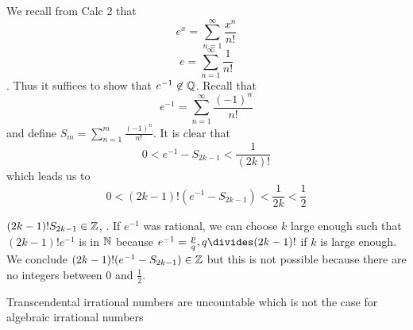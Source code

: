 \begin{solution}
	We recall from Calc 2 that 
	\[
		e^x = \sum_{n=1}^{\infty} \frac{x^n}{n!}
	\]
	\[
		e = \sum_{n=1}^{\infty} \frac{1}{n!}
	\].
	Thus it suffices to show that \( e^{-1} \not \in \mathbb{Q} \). Recall that
	\[
		e^{-1} = \sum_{n=1}^{\infty} \frac{(-1)^n}{n!}
	\]
	and define \( S_m = \sum_{n=1}^{m} \frac{(-1)^n}{n!} \). It is clear that 
	\[
		0 < e^{-1} - S_{2k-1} < \frac{1}{(2k)!}
	\]
	which leads us to 
	\[
		0 < (2k-1)! (e^{-1}-S_{2k-1}) < \frac{1}{2k} < \frac{1}{2}
	\]

	\( (2k-1)!S_{2k-1} \in \mathbb{Z} \),
	.
	If \( e^{-1} \) was rational, we can choose \( k \) large enough such that 
	\( (2k-1)!e^{-1} \) is in \( \mathbb{N} \) because \( e^{-1} = \frac{p}{q}, q \divides
	(2k-1)! \) if \( k \) is large enough. We conclude \( (2k-1)!(e^{-1}-S_{2k-1}) \in \mathbb{Z} \) but
	this is not possible because there are no integers between \( 0 \) and 
	\( \frac{1}{2} \).
\end{solution}

\begin{note}
	Transcendental irrational numbers are uncountable which is not the case for algebraic
	irrational numbers
\end{note}
